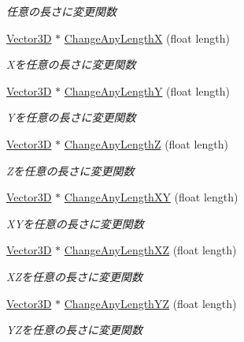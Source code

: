 \begin{DoxyCompactItemize}
\begin{DoxyCompactList}\small\item\em 任意の長さに変更関数 \end{DoxyCompactList}\item 
\mbox{\hyperlink{class_vector3_d}{Vector3D}} $\ast$ \mbox{\hyperlink{class_vector3_d_a3a28833aece711a085634cd98e5c6d74}{Change\+Any\+LengthX}} (float length)
\begin{DoxyCompactList}\small\item\em Xを任意の長さに変更関数 \end{DoxyCompactList}\item 
\mbox{\hyperlink{class_vector3_d}{Vector3D}} $\ast$ \mbox{\hyperlink{class_vector3_d_a2444fe3402cb2b869bb17ec15559f036}{Change\+Any\+LengthY}} (float length)
\begin{DoxyCompactList}\small\item\em Yを任意の長さに変更関数 \end{DoxyCompactList}\item 
\mbox{\hyperlink{class_vector3_d}{Vector3D}} $\ast$ \mbox{\hyperlink{class_vector3_d_aeb984fa3378a2f19e98e24e042d9533c}{Change\+Any\+LengthZ}} (float length)
\begin{DoxyCompactList}\small\item\em Zを任意の長さに変更関数 \end{DoxyCompactList}\item 
\mbox{\hyperlink{class_vector3_d}{Vector3D}} $\ast$ \mbox{\hyperlink{class_vector3_d_a15f0c8fd120fe271e2b87115015e96f8}{Change\+Any\+Length\+XY}} (float length)
\begin{DoxyCompactList}\small\item\em X\+Yを任意の長さに変更関数 \end{DoxyCompactList}\item 
\mbox{\hyperlink{class_vector3_d}{Vector3D}} $\ast$ \mbox{\hyperlink{class_vector3_d_a99c8f6195ee59955b562cb746520a6b4}{Change\+Any\+Length\+XZ}} (float length)
\begin{DoxyCompactList}\small\item\em X\+Zを任意の長さに変更関数 \end{DoxyCompactList}\item 
\mbox{\hyperlink{class_vector3_d}{Vector3D}} $\ast$ \mbox{\hyperlink{class_vector3_d_aa008639776dce3f6aed3f88fb2d67ded}{Change\+Any\+Length\+YZ}} (float length)
\begin{DoxyCompactList}\small\item\em Y\+Zを任意の長さに変更関数 \end{DoxyCompactList}\item 

\end{DoxyCompactItemize}
